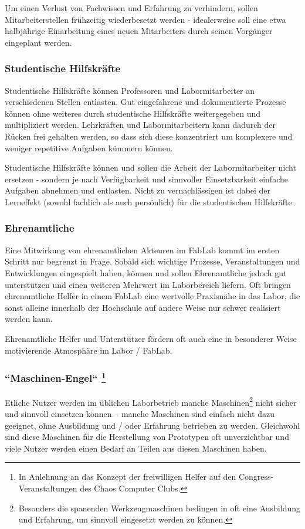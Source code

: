 \documentclass[parskip=half,headsepline,footsepline,titlepage]{scrartcl}
\begin{document}
Um einen Verlust von Fachwissen und Erfahrung zu verhindern, sollen Mitarbeiterstellen frühzeitig wiederbesetzt werden - idealerweise soll eine etwa halbjährige Einarbeitung eines neuen Mitarbeiters durch seinen Vorgänger eingeplant werden.

\subsubsection{Studentische Hilfskräfte}
Studentische Hilfskräfte können Professoren und Labormitarbeiter an verschiedenen Stellen entlasten. Gut eingefahrene und dokumentierte Prozesse können ohne weiteres durch studentische Hilfskräfte weitergegeben und multipliziert werden. Lehrkräften und Labormitarbeitern kann dadurch der Rücken frei gehalten werden, so dass sich diese konzentriert um komplexere und weniger repetitive Aufgaben kümmern können.

Studentische Hilfskräfte können und sollen die Arbeit der Labormitarbeiter nicht ersetzen - sondern je nach Verfügbarkeit und sinnvoller Einsetzbarkeit einfache Aufgaben abnehmen und entlasten. Nicht zu vernachlässigen ist dabei der Lerneffekt (sowohl fachlich als auch persönlich) für die studentischen Hilfskräfte.


\subsubsection{Ehrenamtliche}
Eine Mitwirkung von ehrenamtlichen Akteuren im FabLab kommt im ersten Schritt nur begrenzt in Frage. Sobald sich wichtige Prozesse, Veranstaltungen und Entwicklungen eingespielt haben, können und sollen Ehrenamtliche jedoch gut unterstützen und einen weiteren Mehrwert im Laborbereich liefern.
Oft bringen ehrenamtliche Helfer in einem FabLab eine wertvolle Praxisnähe in das Labor, die sonst alleine innerhalb der Hochschule auf andere Weise nur schwer realisiert werden kann.

Ehrenamtliche Helfer und Unterstützer fördern oft auch eine in besonderer Weise motivierende Atmosphäre im Labor / FabLab.


\label{sssec:maschinenengel}\subsubsection[``Maschinen-Engel'']{``Maschinen-Engel`` \protect\footnote{In Anlehnung an das Konzept der freiwilligen Helfer auf den Congress-Veranstaltungen des Chaos Computer Clubs.} }
Etliche Nutzer werden im üblichen Laborbetrieb manche Maschinen\footnote{Besonders die spanenden Werkzeugmaschinen bedingen in oft eine Ausbildung und Erfahrung, um sinnvoll eingesetzt werden zu können.} nicht sicher und sinnvoll einsetzen können -- manche Maschinen sind einfach nicht dazu geeignet, ohne Ausbildung und / oder Erfahrung betrieben zu werden.
Gleichwohl sind diese Maschinen für die Herstellung von Prototypen oft unverzichtbar und viele Nutzer werden einen Bedarf an Teilen aus diesen Maschinen haben.
\end{document}

